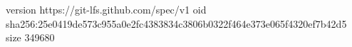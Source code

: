 version https://git-lfs.github.com/spec/v1
oid sha256:25e0419de573c955a0e2fc4383834c3806b0322f464e373e065f4320ef7b42d5
size 349680
